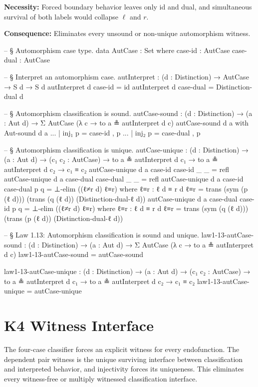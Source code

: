\documentclass[11pt,a4paper]{book}
\def\texttt#1{#1}%
\def\texorpdfstring#1#2{#2}%
\begin{document}
\textbf{Necessity:} Forced boundary behavior leaves only \texttt{id} and \texttt{dual}, and simultaneous survival of both labels would collapse $\ell$ and $r$.

\textbf{Consequence:} Eliminates every unsound or non-unique automorphism witness.

\begin{code}
-- § Automorphism case type.
data AutCase : Set where
  case-id   : AutCase
  case-dual : AutCase

-- § Interpret an automorphism case.
autInterpret : (d : Distinction) → AutCase → S d → S d
autInterpret d case-id   = id
autInterpret d case-dual = Distinction-dual d

-- § Automorphism classification is sound.
autCase-sound :
  (d : Distinction) →
  (a : Aut d) →
  Σ AutCase (λ c → to a ≗ autInterpret d c)
autCase-sound d a with Aut-sound d a
... | inj₁ p = case-id   , p
... | inj₂ p = case-dual , p

-- § Automorphism classification is unique.
autCase-unique :
  (d : Distinction) →
  (a : Aut d) →
  (c₁ c₂ : AutCase) →
  to a ≗ autInterpret d c₁ →
  to a ≗ autInterpret d c₂ →
  c₁ ≡ c₂
autCase-unique d a case-id case-id _ _ = refl
autCase-unique d a case-dual case-dual _ _ = refl
autCase-unique d a case-id case-dual p q =
  ⊥-elim ((ℓ≠r d) ℓ≡r)
  where
    ℓ≡r : ℓ d ≡ r d
    ℓ≡r =
      trans (sym (p (ℓ d)))
        (trans (q (ℓ d)) (Distinction-dual-ℓ d))
autCase-unique d a case-dual case-id p q =
  ⊥-elim ((ℓ≠r d) ℓ≡r)
  where
    ℓ≡r : ℓ d ≡ r d
    ℓ≡r =
      trans (sym (q (ℓ d)))
        (trans (p (ℓ d)) (Distinction-dual-ℓ d))

-- § Law 1.13: Automorphism classification is sound and unique.
law1-13-autCase-sound :
  (d : Distinction) →
  (a : Aut d) →
  Σ AutCase (λ c → to a ≗ autInterpret d c)
law1-13-autCase-sound = autCase-sound

law1-13-autCase-unique :
  (d : Distinction) →
  (a : Aut d) →
  (c₁ c₂ : AutCase) →
  to a ≗ autInterpret d c₁ →
  to a ≗ autInterpret d c₂ →
  c₁ ≡ c₂
law1-13-autCase-unique = autCase-unique
\end{code}

\section{K\texorpdfstring{$_4$}{4} Witness Interface}

The four-case classifier forces an explicit witness for every endofunction.
The dependent pair witness is the unique surviving interface between classification and interpreted behavior, and injectivity forces its uniqueness.
This eliminates every witness-free or multiply witnessed classification interface.
\end{document}
